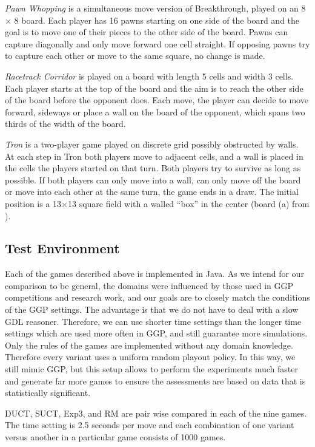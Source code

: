\documentclass[conference]{IEEEtran}
\begin{document}
\textit{Pawn Whopping} is a simultaneous move version of Breakthrough, played on an 8 $\times$ 8 board. Each player has 
16 pawns starting on one side of the board and the goal is to move one of their pieces to the other side of the board. 
Pawns can capture diagonally and only move forward one cell straight.
If opposing pawns try to capture each other or move to the same square, no change is made. 

\textit{Racetrack Corridor} is played on a board with length 5 cells and width 3 cells. Each player starts at the top of the board and the aim is to reach the other side of the board before the opponent does. Each move, the player can decide to move forward, sideways or place a wall on the board of the opponent, which spans two thirds of the width of the board.

\textit{Tron} is a two-player game played on discrete grid possibly obstructed by walls. At each
step in Tron both players move to adjacent cells, and a wall is placed in the cells the players started on that turn. 
Both players try to survive as long as possible. If both players can only move into a wall, can only move off the board or move into each other at the same turn, the game ends in a draw. The initial position is a 13$\times$13 square field with a walled ``box'' in the center (board (a) from \cite{Lanctot13Tron}).
 

\subsection{Test Environment}

Each of the games described above is implemented in Java. As we intend for our comparison to be general, the domains were 
influenced by those used in GGP competitions and research work, and our goals are to closely match the conditions of the 
GGP settings. 
The advantage is that we do not have to deal with a slow GDL reasoner. Therefore, we can use shorter time settings than 
the longer time settings which are used more often in GGP, and still guarantee more simulations. Only the rules of the 
games are implemented without any domain knowledge. Therefore every variant uses a uniform random playout policy. 
In this way, we still mimic GGP, but this setup allows to perform 
the experiments much faster and generate far more games to ensure the assessments are based on data that is statistically
significant. 

DUCT, SUCT, Exp3, and RM are pair wise compared in each of the nine games. The time setting is 2.5 seconds per move and 
each combination of one variant versus another in a particular game consists of 1000 games.  
\end{document}
